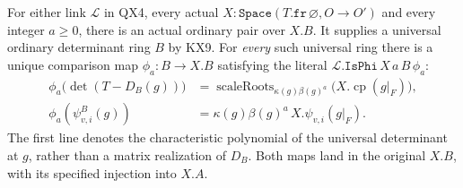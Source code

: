 \begin{proposition}
\label{claim:QX5}
For either link $\mathcal L$ in QX4, every actual
$X:\texttt{Space}(T.\texttt{fr}\,\varnothing,O\to O')$ and every
integer $a\ge0$, there is an actual ordinary pair over $X.B$.
It supplies a universal ordinary determinant ring $B$ by KX9.
For \emph{every} such universal ring there is a unique comparison
map $\phi_a:B\to X.B$ satisfying the literal
$\mathcal L.\texttt{IsPhi}\,X\,a\,B\,\phi_a$:
\[
 \begin{split}
 \phi_a\bigl(\det(T-D_B(g))\bigr)
  &=\operatorname{scaleRoots}_{\kappa(g)\beta(g)^a}
                    \bigl(X.\operatorname{cp}(g|_F)\bigr),\\
 \phi_a(\psi^B_{v,i}(g))
  &=\kappa(g)\beta(g)^a\,X.\psi_{v,i}(g|_F).
 \end{split}
 \tag{QX.15}
\]
The first line denotes the characteristic polynomial of the
universal determinant at $g$, rather than a matrix realization
of $D_B$.  Both maps land in the original $X.B$, with its
specified injection into $X.A$.
\end{proposition}
